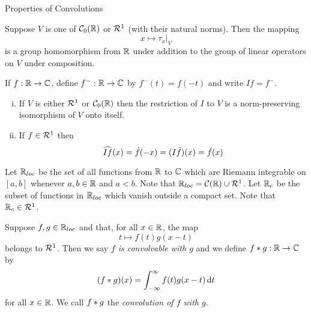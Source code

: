 \begin{section}{Properties of Convolutions}
\begin{lemma}
\begin{enumerate}[i)]
	\end{enumerate}
\end{lemma}

\begin{lemma}
		Suppose $V$ is one of $\ctszeror$ or $\absint$ (with their natural
		norms). Then the mapping
			\begin{displaymath}
				x \mapsto \tau_x \bigg \vert_V
			\end{displaymath}
		is a group homomorphism from $\real$ under addition to the group
		of linear operators on $V$ under composition.
\end{lemma}

\begin{defn}
	If $f:\real \rightarrow \cmplx$, define $f^-:\real \rightarrow \cmplx$
	by $f^-(t)=f(-t)$ and write $If=f^-$.
\end{defn}

\begin{lemma}
	\begin{enumerate}[i)]
		\item
			If $V$ is either $\absint$ or $\ctszeror$ then the restriction of
			$I$ to $V$ is a norm-preserving isomorphism of $V$ onto itself.
		\item
			If $f \in \absint$ then
				\begin{displaymath}
					\F[If](x)=\f(-x)=(I\f)(x)=\check{f}(x)
				\end{displaymath}
	\end{enumerate}
\end{lemma}

\begin{defn}
	Let $\Rloc$ be the set of all functions from $\real$ to $\cmplx$ which
	are Riemann integrable on $[a,b]$ whenever $a,b \in \real$ and $a < b$.
	Note that $\Rloc = \ctsr \cup \absint$. Let $\Rc$ be the subset of
	functions in $\Rloc$ which vanish outside a compact set. Note that $\Rc
	\in \absint$.
\end{defn}
	

\begin{defn}
	Suppose $f,g \in \Rloc$ and that, for all $\isreal$, the map
		\begin{displaymath}
			t \mapsto f(t)g(x-t)
		\end{displaymath}
	belongs to $\absint$. Then we say \emph{$f$ is convolvable with $g$}
	and	we define $\conva{f}{g}:\real \rightarrow \cmplx$ by
		\begin{displaymath}
			\convb{f}{g}{x} = \myintb{f(t)g(x-t)}{t}
		\end{displaymath}
	for all $\isreal$. We call $\conva{f}{g}$ the \emph{convolution of
	$f$ with $g$}.
\end{defn}
	

\end{section}
